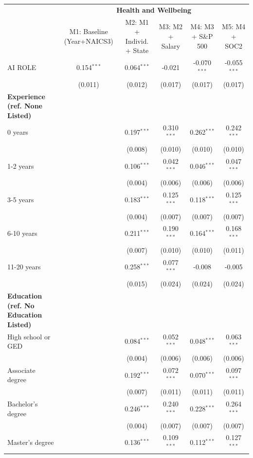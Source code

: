 \begin{table}[!htbp]
\centering
\tiny
\begin{tabular}{lccccc}
\toprule
 & \multicolumn{5}{c}{\textbf{Health and Wellbeing}} \\
 & M1: Baseline (Year+NAICS3) & M2: M1 + Individ. + State & M3: M2 + Salary & M4: M3 + S\&P 500 & M5: M4 + SOC2 \\
\midrule
AI ROLE & 0.154$^{***}$ & 0.064$^{***}$ & -0.021 & -0.070$^{***}$ & -0.055$^{***}$ \\
 & (0.011) & (0.012) & (0.017) & (0.017) & (0.017) \\
\midrule
\textbf{Experience (ref. None Listed)} &  &  &  &  &  \\
0 years &  & 0.197$^{***}$ & 0.310$^{***}$ & 0.262$^{***}$ & 0.242$^{***}$ \\
 &  & (0.008) & (0.010) & (0.010) & (0.010) \\
1-2 years &  & 0.106$^{***}$ & 0.042$^{***}$ & 0.046$^{***}$ & 0.047$^{***}$ \\
 &  & (0.004) & (0.006) & (0.006) & (0.006) \\
3-5 years &  & 0.183$^{***}$ & 0.125$^{***}$ & 0.118$^{***}$ & 0.125$^{***}$ \\
 &  & (0.004) & (0.007) & (0.007) & (0.007) \\
6-10 years &  & 0.211$^{***}$ & 0.190$^{***}$ & 0.164$^{***}$ & 0.168$^{***}$ \\
 &  & (0.007) & (0.010) & (0.010) & (0.011) \\
11-20 years &  & 0.258$^{***}$ & 0.077$^{***}$ & -0.008 & -0.005 \\
 &  & (0.015) & (0.024) & (0.024) & (0.024) \\
\midrule
\textbf{Education (ref. No Education Listed)} &  &  &  &  &  \\
High school or GED &  & 0.084$^{***}$ & 0.052$^{***}$ & 0.048$^{***}$ & 0.063$^{***}$ \\
 &  & (0.004) & (0.006) & (0.006) & (0.006) \\
Associate degree &  & 0.192$^{***}$ & 0.072$^{***}$ & 0.070$^{***}$ & 0.097$^{***}$ \\
 &  & (0.007) & (0.011) & (0.011) & (0.011) \\
Bachelor's degree &  & 0.246$^{***}$ & 0.240$^{***}$ & 0.228$^{***}$ & 0.264$^{***}$ \\
 &  & (0.004) & (0.007) & (0.007) & (0.007) \\
Master's degree &  & 0.136$^{***}$ & 0.109$^{***}$ & 0.112$^{***}$ & 0.127$^{***}$ \\

\end{tabular}
\end{table}
